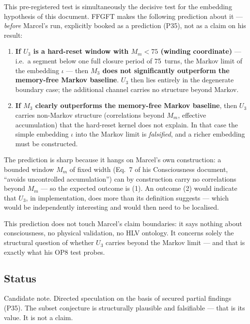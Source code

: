 This pre-registered test is simultaneously the decisive test for the
embedding hypothesis of this document. FFGFT makes the following prediction
about it --- \emph{before} Marcel's run, explicitly booked as a prediction
(P35), not as a claim on his result:

\begin{enumerate}
  \item \textbf{If $U_3$ is a hard-reset window with $M_m < 75$ (winding
    coordinate)} --- i.e.\ a segment below one full closure period of 75~turns, the Markov limit
    of the embedding $\iota$ --- then \textbf{$M_3$ does not significantly
    outperform the memory-free Markov baseline}. $U_3$ then lies entirely in
    the degenerate boundary case; the additional channel carries no
    structure beyond Markov.
  \item \textbf{If $M_3$ clearly outperforms the memory-free Markov
    baseline}, then $U_3$ carries non-Markov structure (correlations beyond
    $M_m$, effective accumulation) that the hard-reset kernel does not
    explain. In that case the simple embedding $\iota$ into the Markov limit
    is \emph{falsified}, and a richer embedding must be constructed.
\end{enumerate}

The prediction is sharp because it hangs on Marcel's own construction: a
bounded window $M_m$ of fixed width (Eq.~7 of his Consciousness document,
\enquote{avoids uncontrolled accumulation}) can by construction carry no
correlations beyond $M_m$ --- so the expected outcome is (1). An outcome (2)
would indicate that $U_3$, in implementation, does more than its definition
suggests --- which would be independently interesting and would then need to
be localised.

This prediction does not touch Marcel's claim boundaries: it says nothing
about consciousness, no physical validation, no HLV ontology. It concerns
solely the structural question of whether $U_3$ carries beyond the Markov
limit --- and that is exactly what his OP8 test probes.

\subsection*{Status}

Candidate note. Directed speculation on the basis of secured partial
findings (P35). The subset conjecture is structurally plausible and
falsifiable --- that is its value. It is not a claim.
